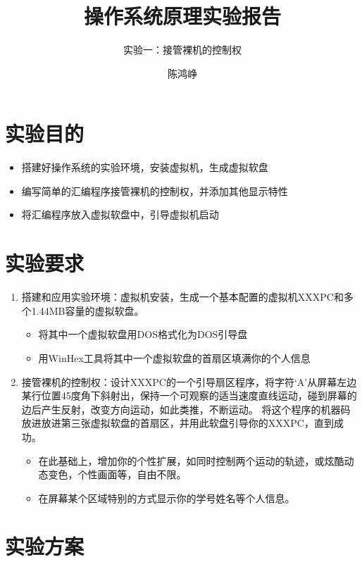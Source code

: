 \documentclass[logo,reportComp]{thesis}
\title{操作系统原理实验报告}
\subtitle{实验一：接管裸机的控制权}
\author{陈鸿峥}
\begin{document}
\maketitle

\section{实验目的}
\begin{itemize}
	\item 搭建好操作系统的实验环境，安装虚拟机，生成虚拟软盘
	\item 编写简单的汇编程序接管裸机的控制权，并添加其他显示特性
	\item 将汇编程序放入虚拟软盘中，引导虚拟机启动
\end{itemize}

\section{实验要求}
\begin{enumerate}
	\item 搭建和应用实验环境：虚拟机安装，生成一个基本配置的虚拟机XXXPC和多个1.44MB容量的虚拟软盘。
	\begin{itemize}
		\item 将其中一个虚拟软盘用DOS格式化为DOS引导盘
		\item 用WinHex工具将其中一个虚拟软盘的首扇区填满你的个人信息
	\end{itemize}
	\item 接管裸机的控制权：设计XXXPC的一个引导扇区程序，将字符`A'从屏幕左边某行位置45度角下斜射出，保持一个可观察的适当速度直线运动，碰到屏幕的边后产生反射，改变方向运动，如此类推，不断运动。
	将这个程序的机器码放进放进第三张虚拟软盘的首扇区，并用此软盘引导你的XXXPC，直到成功。
	\begin{itemize}
		\item 在此基础上，增加你的个性扩展，如同时控制两个运动的轨迹，或炫酷动态变色，个性画面等，自由不限。
		\item 在屏幕某个区域特别的方式显示你的学号姓名等个人信息。
	\end{itemize}
\end{enumerate}

\section{实验方案}
\end{document}
